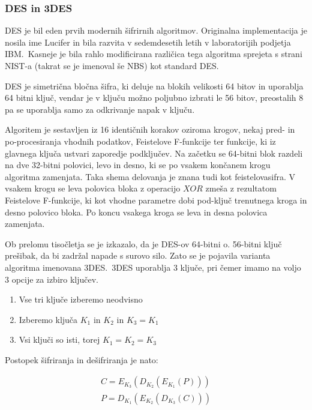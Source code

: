 \documentclass[12pt,a4paper,openany,tikz]{book}
\theoremstyle{plain}
\theoremstyle{definition}
\begin{document}
\subsubsection{DES in 3DES}
\label{subs:DES in 3DES}


\gls{DES} je bil eden prvih modernih šifrirnih algoritmov. Originalna implementacija je nosila ime Lucifer in bila razvita v sedemdesetih letih v laboratorijih podjetja IBM.\  Kasneje je bila rahlo modificirana različica tega algoritma sprejeta s strani \acrshort{NIST}-a (takrat se je imenoval še \acrshort{NBS}) kot standard \gls{DES}.

\gls{DES} je simetrična bločna šifra, ki deluje na blokih velikosti 64 bitov in uporablja 64 bitni ključ, vendar je v ključu možno poljubno izbrati le 56 bitov, preostalih 8 pa se uporablja samo za odkrivanje napak v ključu.

Algoritem je sestavljen iz 16 identičnih korakov oziroma krogov, nekaj pred- in po-procesiranja vhodnih podatkov, Feistelove F-funkcije ter funkcije, ki iz glavnega ključa ustvari zaporedje podključev. Na začetku se 64-bitni blok razdeli na dve 32-bitni polovici, levo in desno, ki se po vsakem končanem krogu algoritma zamenjata. Taka shema delovanja je znana tudi kot \gls{feistelovasifra}. V vsakem krogu se leva polovica bloka z operacijo $XOR$ zmeša z rezultatom Feistelove F-funkcije, ki kot vhodne parametre dobi pod-ključ trenutnega kroga in desno polovico bloka. Po koncu vsakega kroga se leva in desna polovica zamenjata.

Ob prelomu tisočletja se je izkazalo, da je \gls{DES}-ov 64-bitni o. 56-bitni ključ prešibak, da bi zadržal napade s surovo silo. Zato se je pojavila varianta algoritma imenovana 3DES.\ 3DES uporablja 3 ključe, pri čemer imamo na voljo 3 opcije za izbiro ključev.

\begin{enumerate}
\item Vse tri ključe izberemo neodvisno
\item Izberemo ključa $K_1$ in $K_2$ in $K_3=K_1$
\item Vsi ključi so isti, torej $K_1=K_2=K_3$
\end{enumerate}

Postopek šifriranja in dešifriranja je nato:

\begin{gather*}
C=E_{K_3}(D_{K_2}(E_{K_1}(P))) \\
P=D_{K_1}(E_{K_2}(D_{K_3}(C)))
\end{gather*}
\end{document}
